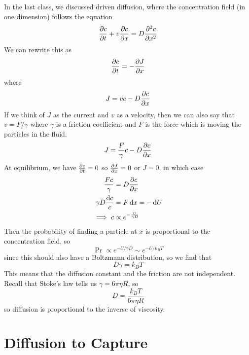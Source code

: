 \documentclass[a4paper,twoside,master.tex]{subfiles}
\begin{document}

In the last class, we discussed driven diffusion, where the concentration field (in one dimension) follows the equation
\begin{equation}
    \pdv{c}{t} + v \pdv{c}{x} = D \pdv[2]{c}{x}
\end{equation}
We can rewrite this as
\begin{equation}
    \pdv{c}{t} = - \pdv{J}{x}
\end{equation}
where
\begin{equation}
    J = v c - D \pdv{c}{x}
\end{equation}
If we think of $ J $ as the current and $ v $ as a velocity, then we can also say that $ v = F / \gamma $ where $ \gamma $ is a friction coefficient and $ F $ is the force which is moving the particles in the fluid.
\begin{equation}
    J = \frac{F}{\gamma} c - D \pdv{c}{x}
\end{equation}
At equilibrium, we have $ \pdv{c}{t} = 0 $ so $ \pdv{J}{x} = 0 $ or $ J = 0 $, in which case
\begin{align}
    \frac{F c}{\gamma} &= D \pdv{c}{x} \\
    \gamma D \frac{\dd{c}}{c} &= F \dd{x} = - \dd{U} \\
    \implies c &\propto e^{- \frac{U}{\gamma D}}
\end{align}
Then the probability of finding a particle at $ x $ is proportional to the concentration field, so
\begin{equation}
    \Pr \propto e^{- U / \gamma D} \sim e^{- U / k_B T} 
\end{equation}
since this should also have a Boltzmann distribution, so we find that
\begin{equation}
    D \gamma = k_B T \tag{Einstein Relation}
\end{equation}
This means that the diffusion constant and the friction are not independent. Recall that Stoke's law tells us $ \gamma = 6 \pi \eta R $, so
\begin{equation}
    D = \frac{k_B T}{6 \pi \eta R} \tag{Fluctuation Dissipation Theorem}
\end{equation}
so diffusion is proportional to the inverse of viscosity.

\section{Diffusion to Capture}\label{sec:diffusion_to_capture}
\end{document}

